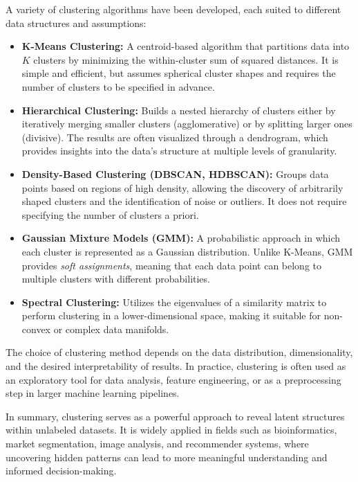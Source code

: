 \documentclass[12pt,a4paper]{report}
\begin{document}
A variety of clustering algorithms have been developed, each suited to different data structures and assumptions:

\begin{itemize}
    \item \textbf{K-Means Clustering:} A centroid-based algorithm that partitions data into $K$ clusters by minimizing the within-cluster sum of squared distances. It is simple and efficient, but assumes spherical cluster shapes and requires the number of clusters to be specified in advance.
    \item \textbf{Hierarchical Clustering:} Builds a nested hierarchy of clusters either by iteratively merging smaller clusters (agglomerative) or by splitting larger ones (divisive). The results are often visualized through a dendrogram, which provides insights into the data’s structure at multiple levels of granularity.
    \item \textbf{Density-Based Clustering (DBSCAN, HDBSCAN):} Groups data points based on regions of high density, allowing the discovery of arbitrarily shaped clusters and the identification of noise or outliers. It does not require specifying the number of clusters a priori.
    \item \textbf{Gaussian Mixture Models (GMM):} A probabilistic approach in which each cluster is represented as a Gaussian distribution. Unlike K-Means, GMM provides \textit{soft assignments}, meaning that each data point can belong to multiple clusters with different probabilities.
    \item \textbf{Spectral Clustering:} Utilizes the eigenvalues of a similarity matrix to perform clustering in a lower-dimensional space, making it suitable for non-convex or complex data manifolds.
\end{itemize}

\vspace{0.5em}
The choice of clustering method depends on the data distribution, dimensionality, and the desired interpretability of results. 
In practice, clustering is often used as an exploratory tool for data analysis, feature engineering, or as a preprocessing step in larger machine learning pipelines.

\vspace{0.5em}
In summary, clustering serves as a powerful approach to reveal latent structures within unlabeled datasets. 
It is widely applied in fields such as bioinformatics, market segmentation, image analysis, and recommender systems, 
where uncovering hidden patterns can lead to more meaningful understanding and informed decision-making.
\end{document}
